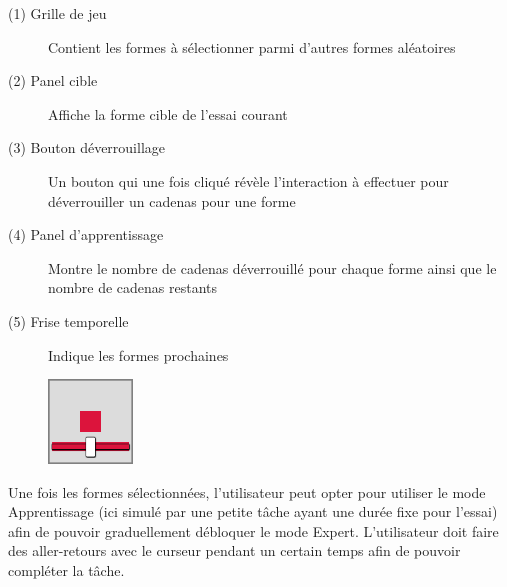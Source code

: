 \documentclass[a4paper, 12pt]{report}
\begin{document}
        
        \begin{description}
            \item[(1) Grille de jeu] Contient les formes à sélectionner parmi d'autres formes aléatoires
            \item[(2) Panel cible] Affiche la forme cible de l'essai courant
            \item[(3) Bouton déverrouillage] Un bouton qui une fois cliqué révèle l'interaction à effectuer pour déverrouiller un cadenas pour une forme
            \item[(4) Panel d'apprentissage] Montre le nombre de cadenas déverrouillé pour chaque forme ainsi que le nombre de cadenas restants
            \item[(5) Frise temporelle] Indique les formes prochaines
        \end{description}
        
        \begin{figure}[H]
            \centering
            \includegraphics[width=0.2\textwidth]{img/unlockTask.png}
        \end{figure}
        
        Une fois les formes sélectionnées, l'utilisateur peut opter pour utiliser le mode Apprentissage
        (ici simulé par une petite tâche ayant une durée fixe pour l'essai) afin de pouvoir
        graduellement débloquer le mode Expert. L'utilisateur doit faire des aller-retours avec
        le curseur pendant un certain temps afin de pouvoir compléter la tâche.
\end{document}
